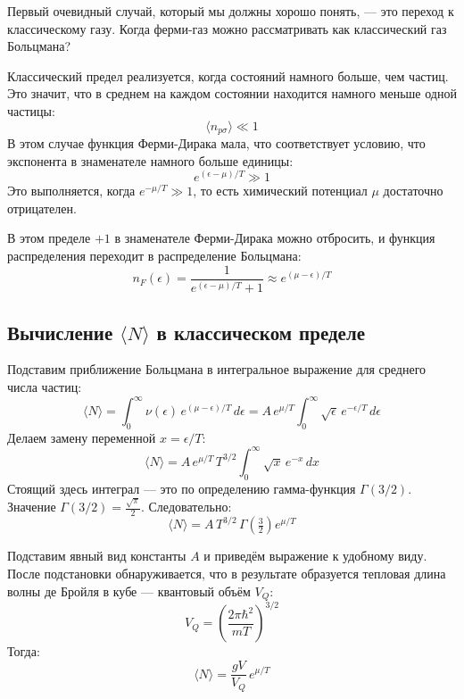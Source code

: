 \documentclass[../general/general]{subfiles}
\begin{document}
Первый очевидный случай, который мы должны хорошо понять, — это переход к классическому газу. Когда ферми-газ можно рассматривать как классический газ Больцмана?

Классический предел реализуется, когда состояний намного больше, чем частиц. Это значит, что в среднем на каждом состоянии находится намного меньше одной частицы:
\begin{equation}
    \langle n_{p\sigma} \rangle \ll 1
\end{equation}
В этом случае функция Ферми-Дирака мала, что соответствует условию, что экспонента в знаменателе намного больше единицы:
\begin{equation}
    e^{(\epsilon - \mu)/T} \gg 1
\end{equation}
Это выполняется, когда $e^{-\mu/T} \gg 1$, то есть химический потенциал $\mu$ достаточно отрицателен.

В этом пределе $+1$ в знаменателе Ферми-Дирака можно отбросить, и функция распределения переходит в распределение Больцмана:
\begin{equation}
    n_F(\epsilon) = \frac{1}{e^{(\epsilon - \mu)/T} + 1} \approx e^{(\mu - \epsilon)/T}
\end{equation}

\subsection{Вычисление $\langle N \rangle$ в классическом пределе}

Подставим приближение Больцмана в интегральное выражение для среднего числа частиц:
\begin{equation}
    \langle N \rangle = \int_0^\infty \nu(\epsilon)\, e^{(\mu - \epsilon)/T}\, d\epsilon = A\, e^{\mu/T} \int_0^\infty \sqrt{\epsilon}\, e^{-\epsilon/T}\, d\epsilon
\end{equation}
Делаем замену переменной $x = \epsilon / T$:
\begin{equation}
    \langle N \rangle = A\, e^{\mu/T}\, T^{3/2} \int_0^\infty \sqrt{x}\, e^{-x}\, dx
\end{equation}
Стоящий здесь интеграл — это по определению гамма-функция $\Gamma(3/2)$. Значение $\Gamma(3/2) = \frac{\sqrt{\pi}}{2}$. Следовательно:
\begin{equation}
    \langle N \rangle = A\, T^{3/2}\, \Gamma\!\left(\tfrac{3}{2}\right) e^{\mu/T}
\end{equation}

Подставим явный вид константы $A$ и приведём выражение к удобному виду. После подстановки обнаруживается, что в результате образуется тепловая длина волны де Бройля в кубе — квантовый объём $V_Q$:
\begin{equation}
    V_Q = \left( \frac{2\pi\hbar^2}{mT} \right)^{3/2}
\end{equation}
Тогда:
\begin{equation}
    \langle N \rangle = \frac{g V}{V_Q}\, e^{\mu/T}
\end{equation}
\end{document}
